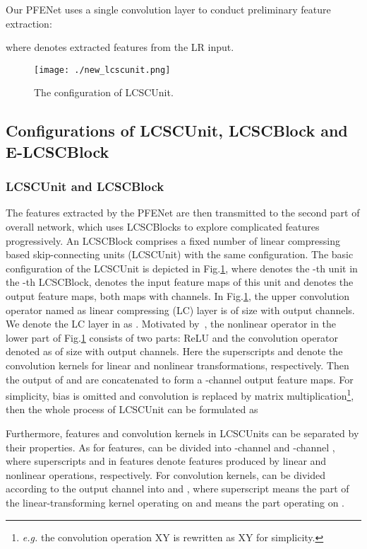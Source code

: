 \documentclass[journal]{IEEEtran}
\begin{document}
Our PFENet uses a single  convolution layer to conduct preliminary feature extraction:

where  denotes extracted features from the LR input.



\begin{figure}[htbp]
\centering
\texttt{[image: ./new\_lcscunit.png]}
\caption{\small The configuration of LCSCUnit.}
\label{fig:F4}
\end{figure}

\subsection{Configurations of LCSCUnit, LCSCBlock and E-LCSCBlock}

\subsubsection{LCSCUnit and LCSCBlock}

The features extracted by the PFENet are then transmitted to the second part of overall network, which uses LCSCBlocks to explore complicated features progressively. An LCSCBlock comprises a fixed number of linear compressing based skip-connecting units (LCSCUnit) with the same configuration. The basic configuration of the LCSCUnit is depicted in Fig.\ref{fig:F4}, where  denotes the -th unit in the -th LCSCBlock,  denotes the input feature maps of this unit and  denotes the output feature maps, both maps with  channels. In Fig.\ref{fig:F4}, the upper convolution operator named as linear compressing (LC) layer is of size  with  output channels. We denote the LC layer in  as . Motivated by~\cite{he2016identity}, the nonlinear operator in the lower part of Fig.\ref{fig:F4} consists of two parts: ReLU and the convolution operator denoted as  of size  with  output channels. Here the superscripts  and  denote the convolution kernels for linear and nonlinear transformations, respectively. Then the output of  and  are concatenated to form a -channel output feature maps. For simplicity, bias is omitted and convolution is replaced by matrix multiplication\footnote{\emph{e.g.} the convolution operation XY is rewritten as XY for simplicity.}, then the whole process of LCSCUnit can be formulated as 


Furthermore, features and convolution kernels in LCSCUnits can be separated by their properties. As for features,  can be divided into -channel  and -channel , where superscripts  and  in features denote features produced by linear and nonlinear operations, respectively. For convolution kernels,  can be divided according to the output channel into  and , where superscript  means the part of the linear-transforming kernel  operating on  and  means the part operating on . 
\end{document}
